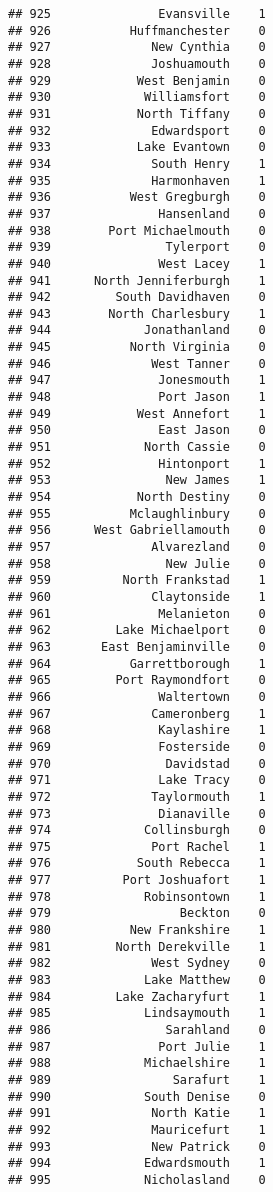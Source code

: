 \documentclass[
]{article}
\begin{document}
\begin{verbatim}
## 925               Evansville    1
## 926           Huffmanchester    0
## 927              New Cynthia    0
## 928              Joshuamouth    0
## 929            West Benjamin    0
## 930             Williamsfort    0
## 931            North Tiffany    0
## 932              Edwardsport    0
## 933            Lake Evantown    0
## 934              South Henry    1
## 935              Harmonhaven    1
## 936           West Gregburgh    0
## 937               Hansenland    0
## 938        Port Michaelmouth    0
## 939                Tylerport    0
## 940               West Lacey    1
## 941      North Jenniferburgh    1
## 942         South Davidhaven    0
## 943        North Charlesbury    1
## 944             Jonathanland    0
## 945           North Virginia    0
## 946              West Tanner    0
## 947               Jonesmouth    1
## 948               Port Jason    1
## 949            West Annefort    1
## 950               East Jason    0
## 951             North Cassie    0
## 952               Hintonport    1
## 953                New James    1
## 954            North Destiny    0
## 955           Mclaughlinbury    0
## 956      West Gabriellamouth    0
## 957              Alvarezland    0
## 958                New Julie    0
## 959          North Frankstad    1
## 960              Claytonside    1
## 961               Melanieton    0
## 962         Lake Michaelport    0
## 963       East Benjaminville    0
## 964           Garrettborough    1
## 965         Port Raymondfort    0
## 966               Waltertown    0
## 967              Cameronberg    1
## 968               Kaylashire    1
## 969               Fosterside    0
## 970                Davidstad    0
## 971               Lake Tracy    0
## 972              Taylormouth    1
## 973               Dianaville    0
## 974             Collinsburgh    0
## 975              Port Rachel    1
## 976            South Rebecca    1
## 977          Port Joshuafort    1
## 978             Robinsontown    1
## 979                  Beckton    0
## 980           New Frankshire    1
## 981         North Derekville    1
## 982              West Sydney    0
## 983             Lake Matthew    0
## 984         Lake Zacharyfurt    1
## 985             Lindsaymouth    1
## 986                Sarahland    0
## 987               Port Julie    1
## 988             Michaelshire    1
## 989                 Sarafurt    1
## 990             South Denise    0
## 991              North Katie    1
## 992              Mauricefurt    1
## 993              New Patrick    0
## 994             Edwardsmouth    1
## 995             Nicholasland    0

\end{verbatim}
\end{document}
